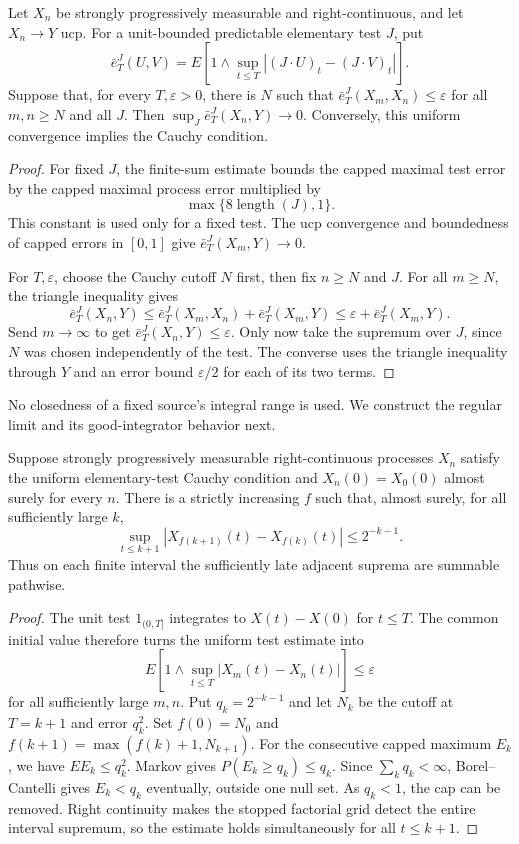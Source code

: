 \begin{proposition}
Let $X_n$ be strongly progressively measurable and right-continuous, and
let $X_n\to Y$ ucp. For a unit-bounded predictable elementary test $J$, put
\[
 \bar e_T^J(U,V)=E[1\wedge\sup_{t\leq T}|(J\cdot U)_t-(J\cdot V)_t|].
\]
Suppose that, for every $T,\varepsilon>0$, there is $N$ such that
$\bar e_T^J(X_m,X_n)\leq\varepsilon$ for all $m,n\geq N$ and all $J$.
Then $\sup_J\bar e_T^J(X_n,Y)\to0$. Conversely, this uniform convergence implies
the Cauchy condition.
\end{proposition}
\begin{proof}
For fixed $J$, the finite-sum estimate bounds the capped maximal test error
by the capped maximal process error multiplied by
\[
 \max\{8\operatorname{length}(J),1\}.
\] This constant is used only for a fixed test. The ucp convergence
and boundedness of capped errors in $[0,1]$ give $\bar e_T^J(X_m,Y)\to0$.

For $T,\varepsilon$, choose the Cauchy cutoff $N$ first, then fix $n\geq N$
and $J$. For all $m\geq N$, the triangle inequality gives
\[
 \bar e_T^J(X_n,Y)\leq \bar e_T^J(X_m,X_n)+\bar e_T^J(X_m,Y)
 \leq\varepsilon+\bar e_T^J(X_m,Y).
\]
Send $m\to\infty$ to get $\bar e_T^J(X_n,Y)\leq\varepsilon$.
Only now take the supremum over $J$, since $N$ was chosen independently
of the test. The converse uses the triangle inequality through $Y$ and
an error bound $\varepsilon/2$ for each of its two terms.
\end{proof}
No closedness of a fixed source's integral range is used. We construct the
regular limit and its good-integrator behavior next.
\begin{proposition}
Suppose strongly progressively measurable right-continuous processes $X_n$
satisfy the uniform elementary-test Cauchy condition and
$X_n(0)=X_0(0)$ almost surely for every $n$. There is a strictly increasing
$f$ such that, almost surely, for all sufficiently large $k$,
\[
 \sup_{t\leq k+1}|X_{f(k+1)}(t)-X_{f(k)}(t)|\leq2^{-k-1}.
\]
Thus on each finite interval the sufficiently late adjacent suprema are
summable pathwise.
\end{proposition}
\begin{proof}
The unit test $1_{(0,T]}$ integrates to $X(t)-X(0)$ for $t\leq T$.
The common initial value therefore turns the uniform test estimate into
\[
 E[1\wedge\sup_{t\leq T}|X_m(t)-X_n(t)|]\leq\varepsilon
\]
for all sufficiently large $m,n$. Put $q_k=2^{-k-1}$ and let $N_k$ be the
cutoff at $T=k+1$ and error $q_k^2$. Set $f(0)=N_0$ and
$f(k+1)=\max(f(k)+1,N_{k+1})$.
For the consecutive capped maximum $E_k$, we have $EE_k\leq q_k^2$.
Markov gives $P(E_k\geq q_k)\leq q_k$.
Since $\sum_kq_k<\infty$, Borel--Cantelli gives $E_k<q_k$ eventually,
outside one null set. As $q_k<1$, the cap can be removed.
Right continuity makes the stopped factorial grid detect the entire interval
supremum, so the estimate holds simultaneously for all $t\leq k+1$.
\end{proof}
